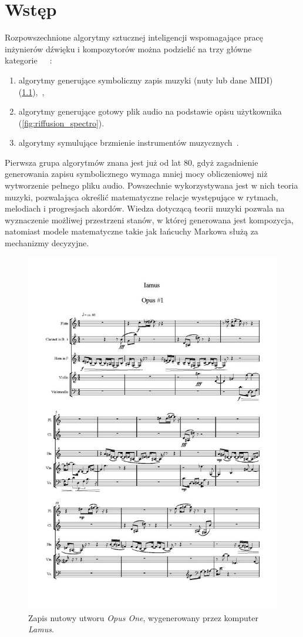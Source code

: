 \chapter{Wstęp}

Rozpowszechnione algorytmy sztucznej inteligencji wspomagające pracę inżynierów dźwięku i kompozytorów
można podzielić na trzy główne kategorie~\cite{ji2020comprehensive}~\cite{analysis_generative}~\label{traditional_algos}:

\begin{enumerate}
    \item algorytmy generujące symboliczny zapis muzyki (nuty lub dane MIDI) (\ref{fig:lamus_notes}),~\cite{zhang2023language},
    \item algorytmy generujące gotowy plik audio na podstawie opisu użytkownika (\ref{fig:riffusion_spectro}).
    \item algorytmy symulujące brzmienie instrumentów muzycznych~\cite{engel2017neural}.
\end{enumerate}

Pierwsza grupa algorytmów znana jest już od lat 80, gdyż zagadnienie generowania zapisu symbolicznego wymaga mniej mocy obliczeniowej niż wytworzenie pełnego pliku audio.
Powszechnie wykorzystywana jest w nich teoria muzyki, pozwalająca określić matematyczne relacje występujące w rytmach, melodiach i progresjach akordów.
Wiedza dotyczącą teorii muzyki pozwala na wyznaczenie możliwej przestrzeni stanów, w której generowana jest kompozycja,
natomiast modele matematyczne takie jak łańcuchy Markowa służą za mechanizmy decyzyjne.

\begin{figure}[H]
    \centering
    \includegraphics[width=0.4\linewidth]{rys01/lamus_notes.jpg}
    \caption{
      Zapis nutowy utworu \textit{Opus One},
      wygenerowany przez komputer \textit{Lamus}.
    }\label{fig:lamus_notes}
\end{figure}

